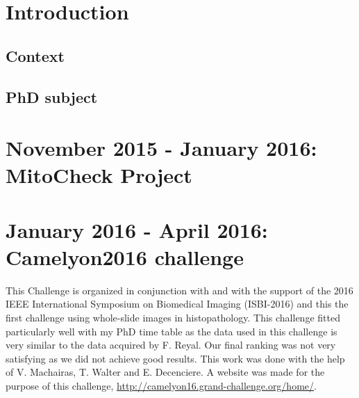 \documentclass{article}
\begin{document}




\newpage
\tableofcontents
\newpage

\section{Introduction}

\subsection{Context}

\subsection{PhD subject}

\section{November 2015 - January 2016: MitoCheck Project}

\section{January 2016 - April 2016: Camelyon2016 challenge}

This Challenge is organized in conjunction with and with the support of the 2016 IEEE International Symposium on Biomedical Imaging  (ISBI-2016) and this the first challenge using whole-slide images in histopathology. This challenge fitted particularly well with my PhD time table as the data used in this challenge is very similar to the data acquired by F. Reyal. Our final ranking was not very satisfying as we did not achieve good results. This work was done with the help of V. Machairas, T. Walter and E. Decenciere. A website was made for the purpose of this challenge, \url{http://camelyon16.grand-challenge.org/home/}.
\end{document}
